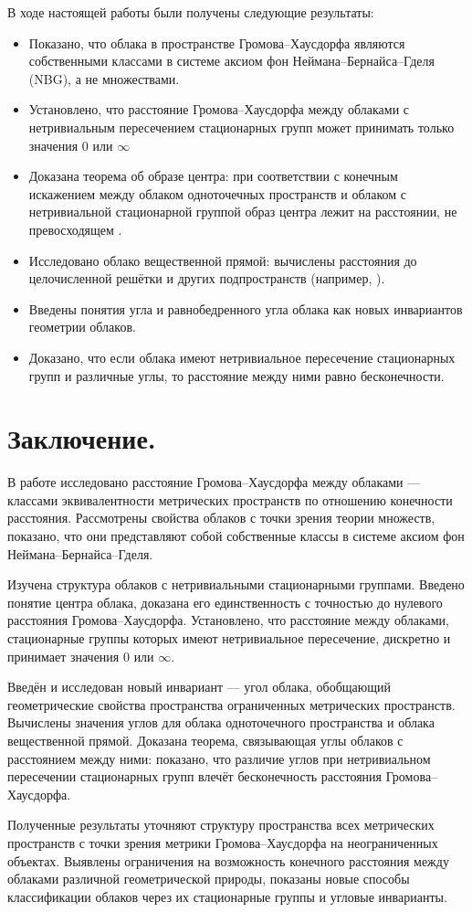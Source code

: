 В ходе настоящей работы были получены следующие результаты:
\begin{itemize}
  \item Показано, что облака в пространстве Громова--Хаусдорфа
    являются собственными классами в системе аксиом фон
    Неймана--Бернайса--Гделя (NBG), а не множествами.
  \item Установлено, что расстояние Громова--Хаусдорфа между облаками
    с нетривиальным пересечением стационарных групп может принимать
    только значения \( 0 \) или \( \infty \)
  \item Доказана теорема об образе центра: при соответствии с
    конечным искажением  между облаком одноточечных пространств и
    облаком с нетривиальной стационарной группой образ центра лежит
    на расстоянии, не превосходящем .
  \item Исследовано облако вещественной прямой: вычислены расстояния
    до целочисленной решётки и других подпространств (например, ).
  \item Введены понятия угла и равнобедренного угла облака как новых
    инвариантов геометрии облаков.
  \item Доказано, что если облака имеют нетривиальное пересечение
    стационарных групп и различные углы, то расстояние между ними
    равно бесконечности.
\end{itemize}
\section{Заключение.}
В работе исследовано расстояние Громова--Хаусдорфа между облаками ---
классами эквивалентности метрических пространств по отношению
конечности расстояния. Рассмотрены свойства облаков с точки зрения
теории множеств, показано, что они представляют собой собственные
классы в системе аксиом фон Неймана--Бернайса--Гделя.

Изучена структура облаков с нетривиальными стационарными группами.
Введено понятие центра облака, доказана его единственность с
точностью до нулевого расстояния Громова--Хаусдорфа. Установлено, что
расстояние между облаками, стационарные группы которых имеют
нетривиальное пересечение, дискретно и принимает значения \( 0 \) или
\( \infty \).

Введён и исследован новый инвариант --- угол облака, обобщающий
геометрические свойства пространства ограниченных метрических
пространств. Вычислены значения углов для облака одноточечного
пространства и облака вещественной прямой. Доказана теорема,
связывающая углы облаков с расстоянием между ними: показано, что
различие углов при нетривиальном пересечении стационарных групп
влечёт бесконечность расстояния Громова--Хаусдорфа.

Полученные результаты уточняют структуру пространства всех
метрических пространств с точки зрения метрики Громова--Хаусдорфа на
неограниченных объектах. Выявлены ограничения на возможность
конечного расстояния между облаками различной геометрической природы,
показаны новые способы классификации облаков через их стационарные
группы и угловые инварианты.
